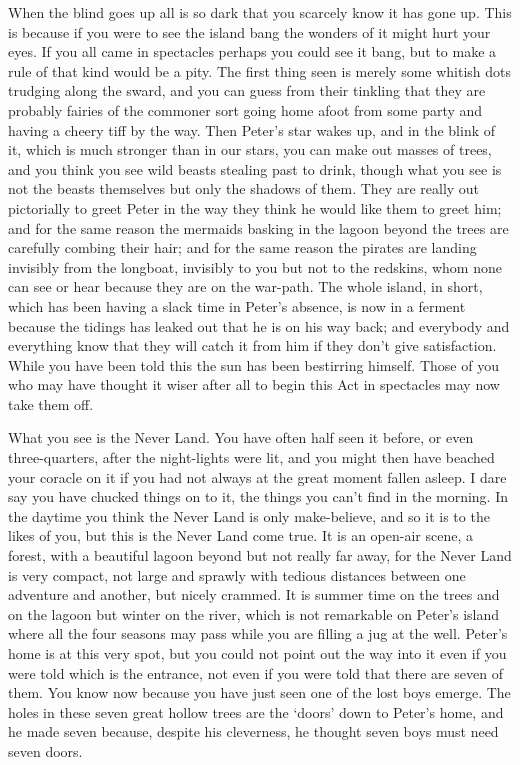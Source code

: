 

\begin{stagedir}

When the blind goes up all is so dark that you scarcely know it has gone up.
This is because if you were to see the island bang
the wonders of it might hurt your eyes.
If you all came in spectacles perhaps you could see it bang,
but to make a rule of that kind would be a pity.
The first thing seen is merely some whitish dots trudging along the sward,
and you can guess from their tinkling that they are probably fairies of the commoner sort
going home afoot from some party and having a cheery tiff by the way.
Then Peter’s star wakes up,
and in the blink of it, which is much stronger than in our stars, you can make out masses of trees,
and you think you see wild beasts stealing past to drink,
though what you see is not the beasts themselves but only the shadows of them.
They are really out pictorially to greet Peter in the way they think he would like them to greet him;
and for the same reason the mermaids basking in the lagoon beyond the trees are carefully combing their hair;
and for the same reason the pirates are landing invisibly from the longboat,
invisibly to you but not to the redskins, whom none can see or hear because they are on the war-path.
The whole island, in short, which has been having a slack time in Peter’s absence,
is now in a ferment because the tidings has leaked out that he is on his way back;
and everybody and everything know that they will catch it from him if they don’t give satisfaction.
While you have been told this the sun
has been bestirring himself.
Those of you who may have thought it wiser after all to begin this Act in spectacles may now take them off.

What you see is the Never Land.
You have often half seen it before, or even three-quarters, after the night-lights were lit,
and you might then have beached your coracle on it if you had not always at the great moment fallen asleep.
I dare say you have chucked things on to it, the things you can’t find in the morning.
In the daytime you think the Never Land is only make-believe, and so it is to the likes of you,
but this is the Never Land come true.
It is an open-air scene, a forest,
with a beautiful lagoon beyond but not really far away, for the Never Land is very compact,
not large and sprawly with tedious distances between one adventure and another, but nicely crammed.
It is summer time on the trees and on the lagoon but winter on the river,
which is not remarkable on Peter’s island where all the four seasons may pass while you are filling a jug at the well.
Peter’s home is at this very spot,
but you could not point out the way into it even if you were told which is the entrance,
not even if you were told that there are seven of them.
You know now because you have just seen one of the lost boys emerge.
The holes in these seven great hollow trees are the ‘doors’ down to Peter’s home,
and he made seven because, despite his cleverness, he thought seven boys must need seven doors.


\end{stagedir}
